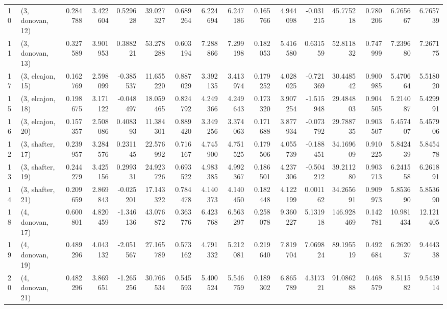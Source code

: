 \begin{tabular}{llrrrrrrrrrrrrrr}
10 &  (3, donovan, 12) &   0.284788 &  3.422604 &  0.529628 &  39.027327 &  0.689264 &   6.224694 &  6.247186 &  0.165766 &  4.944098 & -0.031215 &   45.775218 &  0.780206 &   6.765667 &   6.765739 \\
11 &  (3, donovan, 13) &   0.327589 &  3.901953 &  0.388221 &  53.278288 &  0.603194 &   7.288866 &  7.299198 &  0.182053 &  5.416580 &  0.631559 &   52.811832 &  0.747999 &   7.239680 &   7.267175 \\
17 &  (3, elcajon, 15) &   0.162769 &  2.598099 & -0.385537 &  11.655220 &  0.887029 &   3.392135 &  3.413974 &  0.179252 &  4.028025 & -0.721369 &   30.448542 &  0.900985 &   5.470664 &   5.518020 \\
15 &  (3, elcajon, 18) &   0.198675 &  3.171122 & -0.048497 &  18.059465 &  0.824792 &   4.249366 &  4.249643 &  0.173320 &  3.907254 & -1.515948 &   29.484803 &  0.904505 &   5.214087 &   5.429991 \\
16 &  (3, elcajon, 20) &   0.157357 &  2.508086 &  0.408393 &  11.384301 &  0.889420 &   3.349256 &  3.374063 &  0.171688 &  3.877934 & -0.073792 &   29.788735 &  0.903507 &   5.457407 &   5.457906 \\
12 &  (3, shafter, 17) &   0.239957 &  3.284576 &  0.231145 &  22.576992 &  0.716167 &   4.745900 &  4.751525 &  0.179506 &  4.055739 & -0.188451 &   34.169609 &  0.910225 &   5.842439 &   5.845478 \\
13 &  (3, shafter, 19) &   0.244279 &  3.425156 &  0.299331 &  24.923726 &  0.693522 &   4.983385 &  4.992367 &  0.186501 &  4.237306 & -0.504212 &   39.211280 &  0.903713 &   6.241558 &   6.261891 \\
14 &  (3, shafter, 21) &   0.209659 &  2.869843 & -0.025201 &  17.143322 &  0.784478 &   4.140373 &  4.140450 &  0.182448 &  4.122199 &  0.001162 &   34.265691 &  0.909973 &   5.853690 &   5.853690 \\
18 &  (4, donovan, 17) &   0.600801 &  4.820459 & -1.346136 &  43.076872 &  0.363776 &   6.423768 &  6.563297 &  0.258078 &  9.360227 &  5.131918 &  146.928469 &  0.142781 &  10.981434 &  12.121405 \\
19 &  (4, donovan, 19) &   0.489296 &  4.043132 & -2.051567 &  27.165789 &  0.573162 &   4.791332 &  5.212081 &  0.219640 &  7.819704 &  7.069824 &   89.195519 &  0.492684 &   6.262037 &   9.444338 \\
20 &  (4, donovan, 21) &   0.482296 &  3.869651 & -1.265256 &  30.766534 &  0.545593 &   5.400524 &  5.546759 &  0.189302 &  6.865789 &  4.317321 &   91.086288 &  0.468579 &   8.511582 &   9.543914 \\

\end{tabular}
